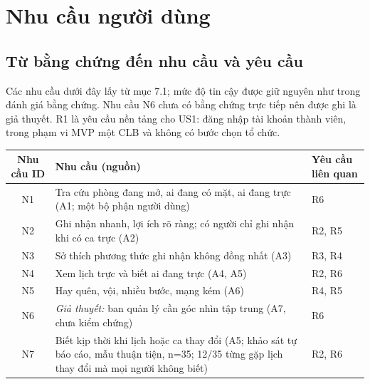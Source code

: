 \section{Nhu cầu người dùng}

\subsection{Từ bằng chứng đến nhu cầu và yêu cầu}
Các nhu cầu dưới đây lấy từ mục 7.1; mức độ tin cậy được giữ nguyên như trong đánh giá bằng chứng. Nhu cầu N6 chưa có bằng chứng trực tiếp nên được ghi là giả thuyết. R1 là yêu cầu nền tảng cho US1: đăng nhập tài khoản thành viên, trong phạm vi MVP một CLB và không có bước chọn tổ chức.
\medskip

\small
\setlength{\tabcolsep}{1.5pt}
{\centering
\begin{tabularx}{0.95\textwidth}{|c|X|X|}
\hline
\textbf{Nhu cầu ID} & \textbf{Nhu cầu (nguồn)} & \textbf{Yêu cầu liên quan} \\ \hline
N1 & Tra cứu phòng đang mở, ai đang có mặt, ai đang trực (A1; một bộ phận người dùng) & R6 \\ \hline
N2 & Ghi nhận nhanh, lợi ích rõ ràng; có người chỉ ghi nhận khi có ca trực (A2) & R2, R5 \\ \hline
N3 & Sở thích phương thức ghi nhận không đồng nhất (A3) & R3, R4 \\ \hline
N4 & Xem lịch trực và biết ai đang trực (A4, A5) & R2, R6 \\ \hline
N5 & Hay quên, vội, nhiều bước, mạng kém (A6) & R4, R5 \\ \hline
N6 & \emph{Giả thuyết:} ban quản lý cần góc nhìn tập trung (A7, chưa kiểm chứng) & R6 \\ \hline
N7 & Biết kịp thời khi lịch hoặc ca thay đổi (A5; khảo sát tự báo cáo, mẫu thuận tiện, n=35; 12/35 từng gặp lịch thay đổi mà mọi người không biết) & R2, R6 \\ \hline
\end{tabularx}\par}

